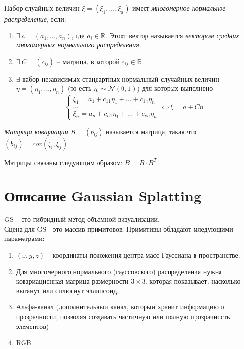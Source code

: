 \begin{definition}
    Набор слуайных величин $\xi = (\xi_1,..., \xi_n)$ имеет \textit{многомерное нормальное распределение}, если:
    \begin{enumerate}
        \item $\exists\ a = (a_1,..., a_n)$, где $a_i \in \mathbb{R}$. Этоот вектор называется \textit{вектором средних многомерных нормального распределения}. 
        \item $\exists\ C = (c_{ij})$ -- матрица, в которой $c_{ij} \in \mathbb{R}$
        \item $\exists$ набор независимых стандартных нормальный случайных величин $\eta = (\eta_1,..., \eta_n)$ (то есть $\eta_i \sim  \mathcal{N}(0,1)$) для которых выполнено 
        $$\begin{cases}
            \xi_1 = a_1 + c_{11}\eta_1 +...+ c_{1n}\eta_n\\
            \dots\\
            \xi_n = a_n + c_{n1}\eta_1 +...+ c_{nn}\eta_n
        \end{cases} \Longleftrightarrow \xi = a + C \eta$$
    \end{enumerate}
    
\end{definition}

\begin{definition}
    \textit{Матрица ковариации} $B = (b_{ij})$ называется матрица, такая что $(b_{ij}) = cov(\xi_i, \xi_j)$ 
\end{definition}

\begin{remark}
    Матрицы связаны следующим образом: $B = B\cdot B^T$ 
\end{remark}

\section{Описание Gaussian Splatting}
\begin{definition}
    GS -- это гибридный метод объемной визуализации.\\
    Сцена для GS - это массив примитовов. Примитивы обладают мледующими параметрами:
    \begin{enumerate}
        \item $(x, y, z)$ -- координаты положения центра масс Гауссиана в пространстве.
        \item Для многомерного нормального (гауссовского) распределения нужна ковариационная матрица размерности $3\times3$, которая показывает, насколько вытянут или сплюснут эллипсоид.
        \item Альфа-канал (дополнительный канал, который хранит информацию о прозрачности, позволяя создавать частичную или полную прозрачность элементов)
        \item RGB
    \end{enumerate}
    
\end{definition}


